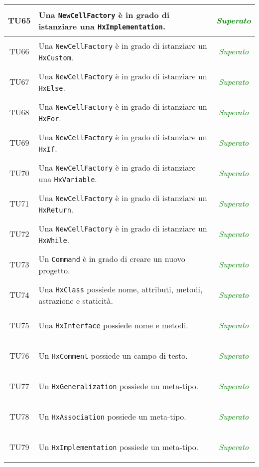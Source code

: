 \begin{longtable}{|c|>{}m{8cm}|c|}
\hypertarget{TU65}{TU65} & Una \texttt{NewCellFactory} è in grado di istanziare una \texttt{HxImplementation}. & \textcolor{Green}{\textit{Superato}}\\ \hline
\hypertarget{TU66}{TU66} & Una \texttt{NewCellFactory} è in grado di istanziare un \texttt{HxCustom}. & \textcolor{Green}{\textit{Superato}}\\ \hline
\hypertarget{TU67}{TU67} & Una \texttt{NewCellFactory} è in grado di istanziare un \texttt{HxElse}. & \textcolor{Green}{\textit{Superato}}\\ \hline
\hypertarget{TU68}{TU68} & Una \texttt{NewCellFactory} è in grado di istanziare un \texttt{HxFor}. & \textcolor{Green}{\textit{Superato}}\\ \hline
\hypertarget{TU69}{TU69} & Una \texttt{NewCellFactory} è in grado di istanziare un \texttt{HxIf}. & \textcolor{Green}{\textit{Superato}}\\ \hline
\hypertarget{TU70}{TU70} & Una \texttt{NewCellFactory} è in grado di istanziare una \texttt{HxVariable}. & \textcolor{Green}{\textit{Superato}}\\ \hline
\hypertarget{TU71}{TU71} & Una \texttt{NewCellFactory} è in grado di istanziare un \texttt{HxReturn}. & \textcolor{Green}{\textit{Superato}}\\ \hline
\hypertarget{TU72}{TU72} & Una \texttt{NewCellFactory} è in grado di istanziare un \texttt{HxWhile}. & \textcolor{Green}{\textit{Superato}}\\ \hline
\hypertarget{TU73}{TU73} & Un \texttt{Command} è in grado di creare un nuovo progetto. & \textcolor{Green}{\textit{Superato}}\\ \hline
\hypertarget{TU74}{TU74} & Una \texttt{HxClass} possiede nome, attributi, metodi, astrazione e staticità. & \textcolor{Green}{\textit{Superato}}\\ \hline
\hypertarget{TU75}{TU75} & Una \texttt{HxInterface} possiede nome e metodi. & \textcolor{Green}{\textit{Superato}}\\ \hline
\hypertarget{TU76}{TU76} & Un \texttt{HxComment} possiede un campo di testo. & \textcolor{Green}{\textit{Superato}}\\ \hline
\hypertarget{TU77}{TU77} & Un \texttt{HxGeneralization} possiede un meta-tipo. & \textcolor{Green}{\textit{Superato}}\\ \hline
\hypertarget{TU78}{TU78} & Un \texttt{HxAssociation} possiede un meta-tipo. & \textcolor{Green}{\textit{Superato}}\\ \hline
\hypertarget{TU79}{TU79} & Un \texttt{HxImplementation} possiede un meta-tipo. & \textcolor{Green}{\textit{Superato}}\\ \hline

\end{longtable}
